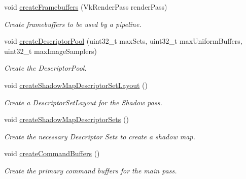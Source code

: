 \begin{DoxyCompactItemize}
void \mbox{\hyperlink{class_render_system_a8649ff90d42a54b7afe20529ba03525e}{create\+Framebuffers}} (Vk\+Render\+Pass render\+Pass)
\begin{DoxyCompactList}\small\item\em Create framebuffers to be used by a pipeline. \end{DoxyCompactList}\item 
void \mbox{\hyperlink{class_render_system_a92ef71c72260306ef0bfc7700d097bc9}{create\+Descriptor\+Pool}} (uint32\+\_\+t max\+Sets, uint32\+\_\+t max\+Uniform\+Buffers, uint32\+\_\+t max\+Image\+Samplers)
\begin{DoxyCompactList}\small\item\em Create the Descriptor\+Pool. \end{DoxyCompactList}\item 
\mbox{\label{class_render_system_a61949d01de7fd18a18014711198c5ccf}} 
void \mbox{\hyperlink{class_render_system_a61949d01de7fd18a18014711198c5ccf}{create\+Shadow\+Map\+Descriptor\+Set\+Layout}} ()
\begin{DoxyCompactList}\small\item\em Create a Descriptor\+Set\+Layout for the Shadow pass. \end{DoxyCompactList}\item 
\mbox{\label{class_render_system_a28c969e8d5ea7d449572c06c89ae0242}} 
void \mbox{\hyperlink{class_render_system_a28c969e8d5ea7d449572c06c89ae0242}{create\+Shadow\+Map\+Descriptor\+Sets}} ()
\begin{DoxyCompactList}\small\item\em Create the necessary Descriptor Sets to create a shadow map. \end{DoxyCompactList}\item 
\mbox{\label{class_render_system_a6a187b0185af36602204db40533daaf8}} 
void \mbox{\hyperlink{class_render_system_a6a187b0185af36602204db40533daaf8}{create\+Command\+Buffers}} ()
\begin{DoxyCompactList}\small\item\em Create the primary command buffers for the main pass. \end{DoxyCompactList}\item 
\mbox{\label{class_render_system_ad2e1bc7f9df303cc2ee02a6677a99ebb}} 

\end{DoxyCompactItemize}
